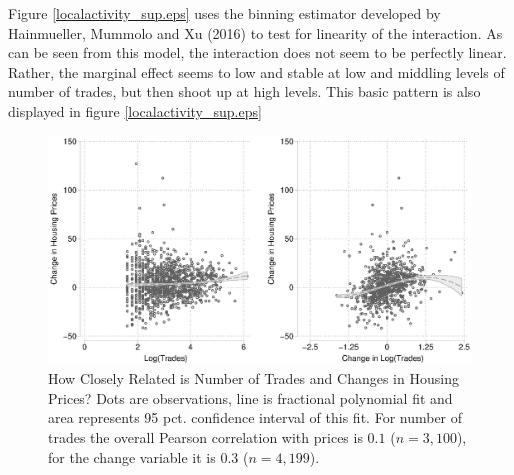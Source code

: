 \documentclass[12pt,a4paper]{article}
\begin{document}
			Figure \ref{localactivity_sup.eps} uses the binning estimator developed by Hainmueller, Mummolo and Xu (2016) to test for linearity of the interaction. As can be seen from this model, the interaction does not seem to be perfectly linear. Rather, the marginal effect seems to low and stable at low and middling levels of number of trades, but then shoot up at high levels.  This basic pattern is also displayed in figure  \ref{localactivity_sup.eps}
			
			\begin{figure}
				\includegraphics[width=1\textwidth]{../figures/corrmoderator.eps}
				\caption{How Closely Related is Number of Trades and Changes in Housing Prices? Dots are observations, line is fractional polynomial fit and area represents 95 pct. confidence interval of this fit. For number of trades the overall Pearson correlation with prices is $0.1$ ($n=3,100$), for the change variable it is $0.3$ ($n=4,199$). }
				\label{scatter}
			\end{figure}
			
\end{document}
